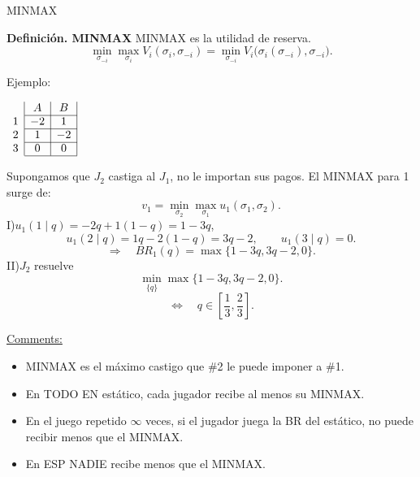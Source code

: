\documentclass[11pt,a4paper]{article}
\makeatletter
\renewcommand\subsection{\@startsection{subsection}{2}{\z@}{-0.7em}{0.25em}
 {\normalfont\normalsize\bfseries\color{inkred}}}
\newenvironment{apuntebox}[1]{\begin{tcolorbox}[colback=palered,colframe=inkred,
 boxrule=0.7pt,arc=0mm,left=0.8em,right=0.8em,top=0.45em,bottom=0.45em]
 \textcolor{inkred}{\textbf{#1}}\quad}{\end{tcolorbox}}
\newcommand{\rojo}[1]{\textcolor{inkred}{#1}}
\newcommand{\gris}[1]{\textcolor{pencilgray}{#1}}
\makeatother
\begin{document}
\subsection{MINMAX}
\begin{apuntebox}{Definición. MINMAX} MINMAX es la utilidad de reserva.
\[
\min_{\sigma_{-i}}\max_{\sigma_i} V_i(\sigma_i,\sigma_{-i})
=\min_{\sigma_{-i}}V_i\bigl(\sigma_i(\sigma_{-i}),\sigma_{-i}\bigr).
\]
\end{apuntebox}
\gris{Ejemplo:}
\begin{center}\renewcommand{\arraystretch}{1.25}
$\begin{array}{c|c|c|}&A&B\\\cline{2-3}1&-2&1\\\cline{2-3}2&1&-2\\\cline{2-3}3&0&0\\\cline{2-3}\end{array}$
\end{center}
Supongamos que $J_2$ castiga al $J_1$, no le importan sus pagos. El MINMAX para 1 surge de:
\[
v_1=\min_{\sigma_2}\max_{\sigma_1}u_1(\sigma_1,\sigma_2).
\]
I)\quad $u_1(1\mid q)=-2q+1(1-q)=1-3q$,
\[
u_1(2\mid q)=1q-2(1-q)=3q-2,\qquad u_1(3\mid q)=0.
\]
\[
\Rightarrow\quad BR_1(q)=\max\{1-3q,3q-2,0\}.
\]
II)\quad $J_2$ resuelve
\[
\min_{\{q\}}\max\{1-3q,3q-2,0\}.
\]
\[
\Longleftrightarrow\quad q\in\left[\frac13,\frac23\right].
\]
\begin{center}
\end{center}
\underline{Comments:}
\begin{itemize}
\item MINMAX es el máximo castigo que \#2 le puede imponer a \#1.
\item En \rojo{TODO EN estático}, cada jugador recibe al menos su MINMAX.
\item En el \rojo{juego repetido $\infty$ veces}, si el jugador juega la BR del estático, no puede recibir menos que el MINMAX.
\item En \rojo{ESP} NADIE recibe menos que el MINMAX.
\end{itemize}
\end{document}
